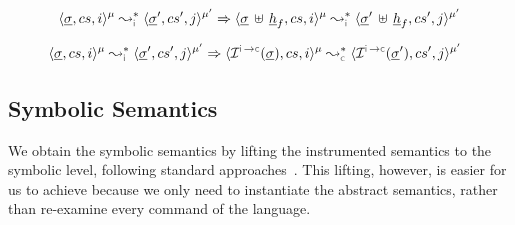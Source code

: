 \begin{theorem}\label{teo:frame:property}
\hspace*{-0.28cm}$$
\transabssemrule{\istate, \cs, i}{\istate', \cs', j}{\mode}{\mode'}{\instrumented}\Rightarrow
        \transabssemrule{\istate \dunion \iheap_f, \cs, i}{\istate' \dunion \iheap_f, \cs', j}{\mode}{\mode'}{\instrumented} 
$$
\end{theorem}

\begin{lemma}\label{lemma:instrumented:semantics}
$$
\hspace*{-0.22cm}
\transabssemrule{\istate, \cs, i}{\istate', \cs', j}{\mode}{\mode'}{\instrumented} \Rightarrow \transabssemrule{\interpret{\instconc}{}(\istate), \cs, i}{\interpret{\instconc}{}(\istate'), \cs', j}{\mode}{\mode'}{\concrete} 
$$
\end{lemma}



%




\vspace*{-0.2cm}
\subsection{\jsil Symbolic Semantics}\label{subsec:symb:semantics}

We obtain the \jsil symbolic semantics by lifting the \jsil instrumented semantics to the symbolic level, following standard approaches~\cite{Rosette1,citemeplease,citememore}.
This lifting, however, is easier for us to achieve because we only need to instantiate the abstract semantics, rather than re-examine every command of the language.

